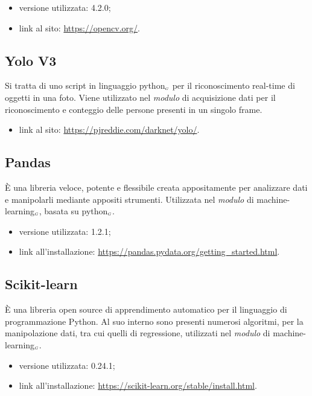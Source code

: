 \begin{itemize}
  \item versione utilizzata: 4.2.0;
  \item link al sito: \url{https://opencv.org/}.
\end{itemize}

\subsection{Yolo V3}\label{LibrerieYoloV3}
Si tratta di uno script in linguaggio python$_{\scaleto{G}{3pt}}$ per il riconoscimento real-time di oggetti in una foto.
Viene utilizzato nel \textit{modulo} di acquisizione dati per il riconoscimento e conteggio delle persone presenti in un singolo frame.

\begin{itemize}
  \item link al sito: \url{https://pjreddie.com/darknet/yolo/}.
\end{itemize}

\subsection{Pandas}\label{LibreriePandas}
È una libreria veloce, potente e flessibile creata appositamente per analizzare dati e manipolarli mediante appositi strumenti.
Utilizzata nel \textit{modulo} di machine-learning$_{\scaleto{G}{3pt}}$, basata su python$_{\scaleto{G}{3pt}}$.

\begin{itemize}
  \item versione utilizzata: 1.2.1;
  \item link all'installazione: \url{https://pandas.pydata.org/getting_started.html}.
\end{itemize}

\subsection{Scikit-learn}\label{LibrerieScikitLearn}
È una libreria open source di apprendimento automatico per il linguaggio di programmazione Python.
Al suo interno sono presenti numerosi algoritmi, per la manipolazione dati, tra cui quelli di regressione, utilizzati nel \textit{modulo} di machine-learning$_{\scaleto{G}{3pt}}$.

\begin{itemize}
  \item versione utilizzata: 0.24.1;
  \item link all'installazione: \url{https://scikit-learn.org/stable/install.html}.
\end{itemize}

